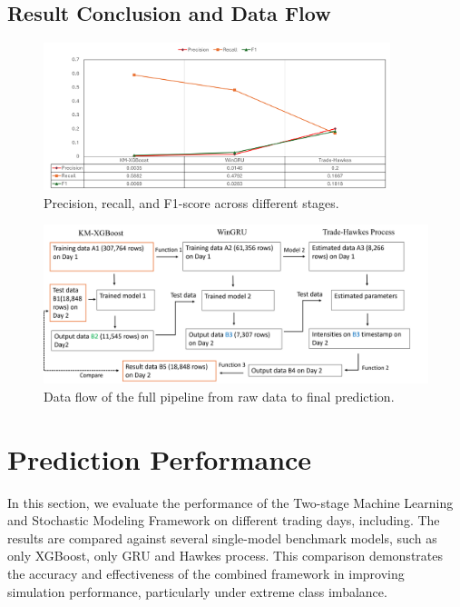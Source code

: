 \subsection{Result Conclusion and Data Flow}
\begin{figure}[H]
    \centering
    \includegraphics[width=0.9\textwidth]{figures/final_performance_plot.png}
    \caption{Precision, recall, and F1-score across different stages.}
    \label{fig:final-performance}
\end{figure}

\begin{figure}[H]
    \centering
    \includegraphics[width=\textwidth]{figures/data flow.png}
    \caption{Data flow of the full pipeline from raw data to final prediction.}
    \label{fig:data-flow-diagram}
\end{figure}




\section{Prediction Performance}
In this section, we evaluate the performance of the Two-stage Machine Learning and Stochastic Modeling Framework on different trading days, including. The results are compared against several single-model benchmark models, such as only XGBoost, only GRU and Hawkes process. This comparison demonstrates the accuracy and effectiveness of the combined framework in improving simulation performance, particularly under extreme class imbalance.













